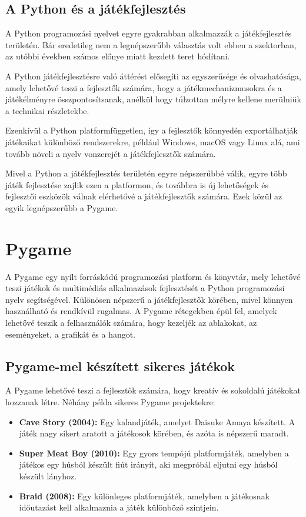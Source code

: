 \subsection{A Python és a játékfejlesztés}
 A Python programozási nyelvet egyre gyakrabban alkalmazzák a játékfejlesztés területén. \cite{python-in-game-dev} Bár eredetileg nem a legnépszerűbb választás volt ebben a szektorban, az utóbbi években számos előnye miatt kezdett teret hódítani.

A Python játékfejlesztésre való áttérést elősegíti az egyszerűsége és olvashatósága, amely lehetővé teszi a fejlesztők számára, hogy a játékmechanizmusokra és a játékélményre összpontosítsanak, anélkül hogy túlzottan mélyre kellene merülniük a technikai részletekbe.

Ezenkívül a Python platformfüggetlen, így a fejlesztők könnyedén exportálhatják játékaikat különböző rendszerekre, például Windows, macOS vagy Linux alá, ami tovább növeli a nyelv vonzerejét a játékfejlesztők számára.

Mivel a Python a játékfejlesztés területén egyre népszerűbbé válik, egyre több játék fejlesztése zajlik ezen a platformon, és továbbra is új lehetőségek és fejlesztői eszközök válnak elérhetővé a játékfejlesztők számára. Ezek közül az egyik legnépszerűbb a Pygame.

\section{Pygame}
 A Pygame \cite{Pygame} egy nyílt forráskódú programozási platform és könyvtár, mely lehetővé teszi játékok és multimédiás alkalmazások fejlesztését a Python programozási nyelv segítségével. Különösen népszerű a játékfejlesztők körében, mivel könnyen használható és rendkívül rugalmas. A Pygame rétegekben épül fel, amelyek lehetővé teszik a felhasználók számára, hogy kezeljék az ablakokat, az eseményeket, a grafikát és a hangot.

\subsection{Pygame-mel készített sikeres játékok}
 A Pygame lehetővé teszi a fejlesztők számára, hogy kreatív és sokoldalú játékokat hozzanak létre. Néhány példa sikeres Pygame projektekre:

\begin{itemize}
    \item \textbf{Cave Story \cite{CaveStory} (2004):} Egy kalandjáték, amelyet Daisuke Amaya készített. A játék nagy sikert aratott a játékosok körében, és azóta is népszerű maradt. 
    \item \textbf{Super Meat Boy \cite{SuperMeatBoy} (2010):} Egy gyors tempójú platformjáték, amelyben a játékos egy húsból készült fiút irányít, aki megpróbál eljutni egy húsból készült lányhoz.
    \item \textbf{Braid \cite{Braid} (2008):} Egy különleges platformjáték, amelyben a játékosnak időutazást kell alkalmaznia a játék különböző szintjein.
\end{itemize}


